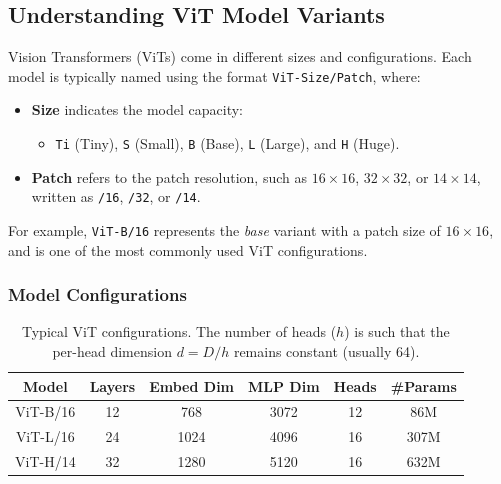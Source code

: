 \subsection{Understanding ViT Model Variants}
\label{sec:chapter18_vit_variants}

\noindent
Vision Transformers (ViTs) come in different sizes and configurations. Each model is typically named using the format \texttt{ViT-Size/Patch}, where:

\begin{itemize}
    \item \textbf{Size} indicates the model capacity:
    \begin{itemize}
        \item \texttt{Ti} (Tiny), \texttt{S} (Small), \texttt{B} (Base), \texttt{L} (Large), and \texttt{H} (Huge).
    \end{itemize}
    
    \item \textbf{Patch} refers to the patch resolution, such as \(16 \times 16\), \(32 \times 32\), or \(14 \times 14\), written as \texttt{/16}, \texttt{/32}, or \texttt{/14}.
\end{itemize}

\noindent
For example, \texttt{ViT-B/16} represents the \emph{base} variant with a patch size of \(16 \times 16\), and is one of the most commonly used ViT configurations.

\subsubsection{Model Configurations}

\begin{table}[H]
    \centering
    \begin{tabular}{|c|c|c|c|c|c|}
        \hline
        \textbf{Model} & \textbf{Layers} & \textbf{Embed Dim} & \textbf{MLP Dim} & \textbf{Heads} & \textbf{\#Params} \\
        \hline
        ViT-B/16 & 12 & 768 & 3072 & 12 & 86M \\
        ViT-L/16 & 24 & 1024 & 4096 & 16 & 307M \\
        ViT-H/14 & 32 & 1280 & 5120 & 16 & 632M \\
        \hline
    \end{tabular}
    \caption{Typical ViT configurations. The number of heads (\(h\)) is such that the per-head dimension \(d = D / h\) remains constant (usually 64).}
    \label{tab:chapter18_vit_model_configurations}
\end{table}

